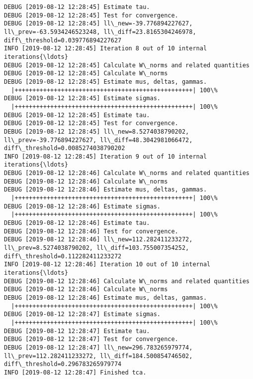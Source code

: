 \documentclass[11pt]{article}
\begin{document}
\begin{Verbatim}[commandchars=\\\{\}]
DEBUG [2019-08-12 12:28:45] Estimate tau.
DEBUG [2019-08-12 12:28:45] Test for convergence.
DEBUG [2019-08-12 12:28:45] ll\_new=-39.776894227627, ll\_prev=-63.5934246523248, ll\_diff=23.8165304246978, diff\_threshold=0.039776894227627
INFO [2019-08-12 12:28:45] Iteration 8 out of 10 internal iterations{\ldots}
DEBUG [2019-08-12 12:28:45] Calculate W\_norms and related quantities
DEBUG [2019-08-12 12:28:45] Calculate W\_norms
DEBUG [2019-08-12 12:28:45] Estimate mus, deltas, gammas.
  |++++++++++++++++++++++++++++++++++++++++++++++++++| 100\%
DEBUG [2019-08-12 12:28:45] Estimate sigmas.
  |++++++++++++++++++++++++++++++++++++++++++++++++++| 100\%
DEBUG [2019-08-12 12:28:45] Estimate tau.
DEBUG [2019-08-12 12:28:45] Test for convergence.
DEBUG [2019-08-12 12:28:45] ll\_new=8.5274038790202, ll\_prev=-39.776894227627, ll\_diff=48.3042981066472, diff\_threshold=0.0085274038790202
INFO [2019-08-12 12:28:45] Iteration 9 out of 10 internal iterations{\ldots}
DEBUG [2019-08-12 12:28:46] Calculate W\_norms and related quantities
DEBUG [2019-08-12 12:28:46] Calculate W\_norms
DEBUG [2019-08-12 12:28:46] Estimate mus, deltas, gammas.
  |++++++++++++++++++++++++++++++++++++++++++++++++++| 100\%
DEBUG [2019-08-12 12:28:46] Estimate sigmas.
  |++++++++++++++++++++++++++++++++++++++++++++++++++| 100\%
DEBUG [2019-08-12 12:28:46] Estimate tau.
DEBUG [2019-08-12 12:28:46] Test for convergence.
DEBUG [2019-08-12 12:28:46] ll\_new=112.282411233272, ll\_prev=8.5274038790202, ll\_diff=103.755007354252, diff\_threshold=0.112282411233272
INFO [2019-08-12 12:28:46] Iteration 10 out of 10 internal iterations{\ldots}
DEBUG [2019-08-12 12:28:46] Calculate W\_norms and related quantities
DEBUG [2019-08-12 12:28:46] Calculate W\_norms
DEBUG [2019-08-12 12:28:46] Estimate mus, deltas, gammas.
  |++++++++++++++++++++++++++++++++++++++++++++++++++| 100\%
DEBUG [2019-08-12 12:28:47] Estimate sigmas.
  |++++++++++++++++++++++++++++++++++++++++++++++++++| 100\%
DEBUG [2019-08-12 12:28:47] Estimate tau.
DEBUG [2019-08-12 12:28:47] Test for convergence.
DEBUG [2019-08-12 12:28:47] ll\_new=296.783265979774, ll\_prev=112.282411233272, ll\_diff=184.500854746502, diff\_threshold=0.296783265979774
INFO [2019-08-12 12:28:47] Finished tca.

    \end{Verbatim}
\end{document}
